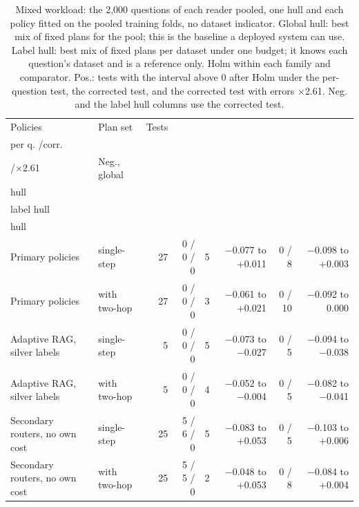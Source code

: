 \begin{table}[t]
\centering\small
\setlength{\tabcolsep}{4pt}
\caption{Mixed workload: the 2,000 questions of each reader pooled, one hull and each policy fitted on the pooled training folds, no dataset indicator. Global hull: best mix of fixed plans for the pool; this is the baseline a deployed system can use. Label hull: best mix of fixed plans per dataset under one budget; it knows each question's dataset and is a reference only. Holm within each family and comparator. Pos.: tests with the interval above 0 after Holm under the per-question test, the corrected test, and the corrected test with errors $\times$2.61. Neg. and the label hull columns use the corrected test.}
\label{tab:extra_mixed}
\begin{tabular*}{\linewidth}{@{\extracolsep{\fill}}llrrrrrr}
\toprule
Policies & Plan set & Tests & \begin{tabular}[b]{@{}r@{}}Pos., global: \\ per q. /corr. \\ /$\times$2.61\end{tabular} & Neg., global & \begin{tabular}[b]{@{}r@{}}Gain, global \\ hull\end{tabular} & \begin{tabular}[b]{@{}r@{}}Pos./neg., \\ label hull\end{tabular} & \begin{tabular}[b]{@{}r@{}}Gain, label \\ hull\end{tabular} \\
\midrule
Primary policies & single-step & 27 & 0 / 0 / 0 & 5 & $-$0.077 to +0.011 & 0 / 8 & $-$0.098 to +0.003 \\
Primary policies & with two-hop & 27 & 0 / 0 / 0 & 3 & $-$0.061 to +0.021 & 0 / 10 & $-$0.092 to 0.000 \\
Adaptive RAG, silver labels & single-step & 5 & 0 / 0 / 0 & 5 & $-$0.073 to $-$0.027 & 0 / 5 & $-$0.094 to $-$0.038 \\
Adaptive RAG, silver labels & with two-hop & 5 & 0 / 0 / 0 & 4 & $-$0.052 to $-$0.004 & 0 / 5 & $-$0.082 to $-$0.041 \\
Secondary routers, no own cost & single-step & 25 & 5 / 6 / 0 & 5 & $-$0.083 to +0.053 & 0 / 5 & $-$0.103 to +0.006 \\
Secondary routers, no own cost & with two-hop & 25 & 5 / 5 / 0 & 2 & $-$0.048 to +0.053 & 0 / 8 & $-$0.084 to +0.004 \\

\end{tabular*}
\end{table}
